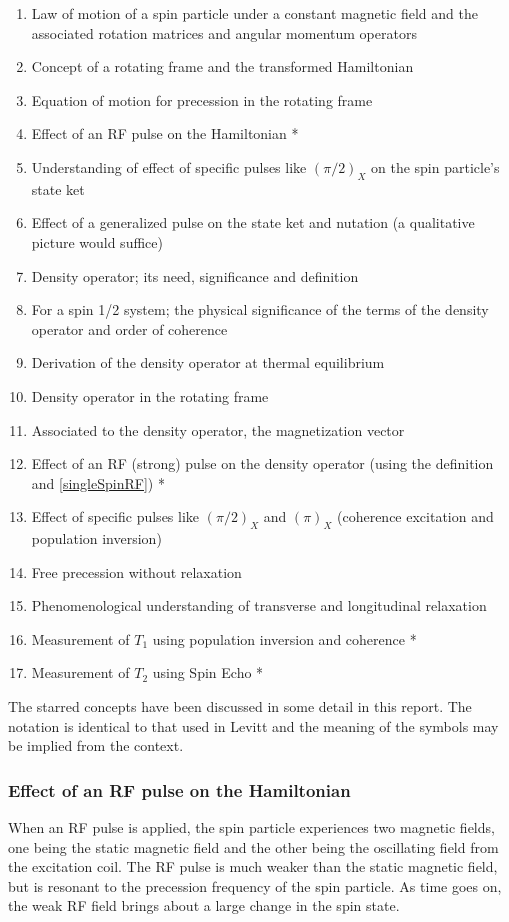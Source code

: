 			\begin{enumerate}
				\item Law of motion of a spin particle under a constant magnetic field and the associated rotation matrices and angular momentum operators
				\item Concept of a rotating frame and the transformed Hamiltonian
				\item Equation of motion for precession in the rotating frame
				\item Effect of an RF pulse on the Hamiltonian \label{singleSpinRF} *
				\item Understanding of effect of specific pulses like $(\pi/2)_X$ on the spin particle's state ket
				\item Effect of a generalized pulse on the state ket and nutation (a qualitative picture would suffice)
				\item Density operator; its need, significance and definition
				\item For a spin 1/2 system; the physical significance of the terms of the density operator and order of coherence
				\item Derivation of the density operator at thermal equilibrium
				\item Density operator in the rotating frame
				\item Associated to the density operator, the magnetization vector
				\item Effect of an RF (strong) pulse on the density operator (using the definition and \autoref{singleSpinRF}) *
				\item Effect of specific pulses like $(\pi/2)_X$ and $(\pi)_X$ (coherence excitation and population inversion)
				\item Free precession without relaxation
				\item Phenomenological understanding of transverse and longitudinal relaxation
				\item Measurement of $T_1$ using population inversion and coherence *
				\item Measurement of $T_2$ using Spin Echo *
			\end{enumerate}

			The starred concepts have been discussed in some detail in this report. The notation is identical to that used in Levitt and the meaning of the symbols may be implied from the context.

		\subsubsection{Effect of an RF pulse on the Hamiltonian}
			When an RF pulse is applied, the spin particle experiences two magnetic fields, one being the static magnetic field and the other being the oscillating field from the excitation coil. The RF pulse is much weaker than the static magnetic field, but is resonant to the precession frequency of the spin particle. As time goes on, the weak RF field brings about a large change in the spin state.


